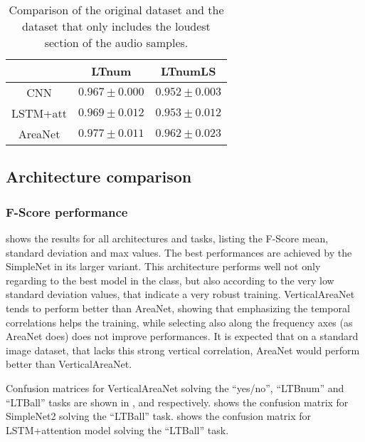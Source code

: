 \begin{table}[t!]
    \centering
    \caption{Comparison of the original dataset and the dataset that only
    includes the loudest section of the audio samples.}
    \label{tab:comparison_loud_section}
    \begin{tabular}{|c|c|c|}
        \hline
        & LTnum & LTnumLS \\
        \hline
        CNN      & $0.967 \pm 0.000$ & $0.952 \pm 0.003$ \\
        LSTM+att & $0.969 \pm 0.012$ & $0.953 \pm 0.012$ \\
        AreaNet  & $0.977 \pm 0.011$ & $0.962 \pm 0.023$ \\
        \hline
    \end{tabular}
\end{table}

\subsection{Architecture comparison}

\subsubsection{F-Score performance}

 shows the results for all architectures and tasks,
listing the F-Score mean, standard deviation and max values.
%
The best performances are achieved by the SimpleNet in its larger variant. This
architecture performs well not only regarding to the best model in the class,
but also according to the very low standard deviation values, that indicate a
very robust training.
%
VerticalAreaNet tends to perform better than AreaNet, showing that emphasizing
the temporal correlations helps the training, while selecting also along the
frequency axes (as AreaNet does) does not improve performances.
%
It is expected that on a standard image dataset, that lacks this strong
vertical correlation, AreaNet would perform better than VerticalAreaNet.

% 


Confusion matrices for VerticalAreaNet solving the ``yes/no'', ``LTBnum'' and
``LTBall'' tasks are shown in ,
 and
 respectively.
%
 shows the confusion
matrix for SimpleNet2 solving the ``LTBall'' task.
%
shows the confusion matrix for LSTM+attention model solving the ``LTBall''
task.

